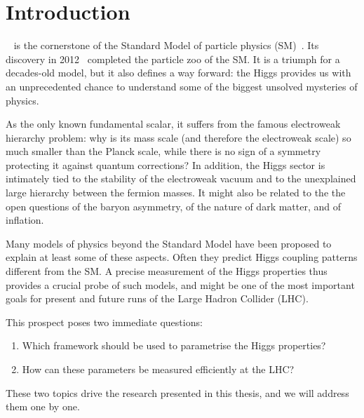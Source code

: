 

\chapter{Introduction}
\label{chapter:Introduction}

~\cite{Higgs:1964ia, Higgs:1964pj,
  Englert:1964et, Guralnik:1964eu, Higgs:1966ev} is the cornerstone
of the Standard Model of particle physics (SM)~\cite{Glashow:1961tr,
  Weinberg:1967tq, Salam:1968rm}. Its discovery in
2012~\cite{Aad:2012tfa, Chatrchyan:2012xdj} completed the particle zoo
of the SM. It
is a triumph for a decades-old model, but it also defines a way
forward: the Higgs provides us with an unprecedented chance to
understand some of the biggest unsolved mysteries of physics.

As the only known fundamental scalar, it suffers from the famous
electroweak hierarchy problem: why is its mass scale (and therefore
the electroweak scale) so much smaller than the Planck scale, while
there is no sign of a symmetry protecting it against quantum
corrections? In addition, the Higgs sector is intimately tied to the
stability of the electroweak vacuum and to the unexplained large
hierarchy between the fermion masses. It might also be related to the
the open questions of the baryon asymmetry, of the nature of dark
matter, and of inflation.

Many models of physics beyond the Standard Model have been proposed to
explain at least some of these aspects. Often they predict Higgs
coupling patterns different from the SM. A precise measurement of
the Higgs properties thus provides a crucial probe of such models, and
might be one of the most important goals for present and future
runs of the Large Hadron Collider (LHC).

This prospect poses two immediate questions:
%
\begin{enumerate}
\item Which framework should be used to parametrise the Higgs
  properties?
\item How can these parameters be measured efficiently at the LHC?
\end{enumerate}
%
These two topics drive the research presented in this thesis, and we
will address them one by one.

